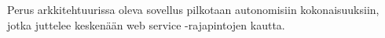 Perus arkkitehtuurissa oleva sovellus pilkotaan autonomisiin kokonaisuuksiin, jotka juttelee keskenään web service -rajapintojen kautta.
